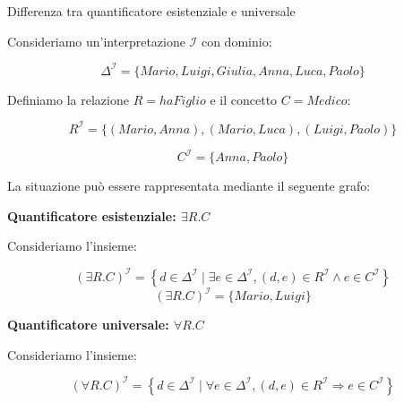 \begin{example}{Differenza tra quantificatore esistenziale e universale}

Consideriamo un'interpretazione $\mathcal I$ con dominio:

\[
\Delta^{\mathcal I}
=
\{Mario, Luigi, Giulia, Anna, Luca, Paolo\}
\]

Definiamo la relazione $R = haFiglio$ e il concetto $C = Medico$:

\[
R^{\mathcal I}
=
\{
(Mario,Anna),
(Mario,Luca),
(Luigi,Paolo)
\}
\]

\[
C^{\mathcal I}=\{Anna,Paolo\}
\]

La situazione può essere rappresentata mediante il seguente grafo:

\begin{center}
\end{center}

\textbf{Quantificatore esistenziale: $\exists R.C$}

Consideriamo l'insieme:

\[
(\exists R.C)^{\mathcal I}
=
\left\{
d\in\Delta^{\mathcal I}
\mid
\exists e\in\Delta^{\mathcal I},
(d,e)\in R^{\mathcal I}
\land e\in C^{\mathcal I}
\right\}
\]
\[
\boxed{
(\exists R.C)^{\mathcal I}
=
\{Mario,Luigi\}
}
\]

\textbf{Quantificatore universale: $\forall R.C$}

Consideriamo l'insieme:

\[
(\forall R.C)^{\mathcal I}
=
\left\{
d\in\Delta^{\mathcal I}
\mid
\forall e\in\Delta^{\mathcal I},
(d,e)\in R^{\mathcal I}
\Rightarrow e\in C^{\mathcal I}
\right\}
\]


\end{example}
